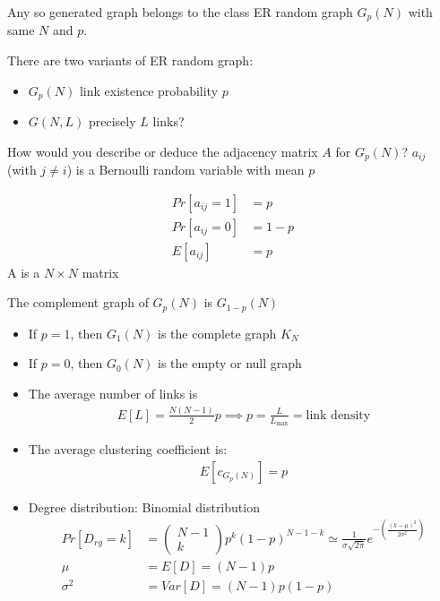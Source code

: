 Any so generated graph belongs to the class ER random graph $G_p(N)$ with same $N$ and $p$.

There are two variants of ER random graph:
\begin{itemize}
  \item $G_p(N)$ link existence probability $p$
  \item $G(N,L)$ precisely $L$ links?
\end{itemize}

How would you describe or deduce the adjacency matrix $A$ for $G_p(N)$?
$a_{ij}$ (with $j \ne i$) is a Bernoulli random variable with mean $p$

\begin{align*}
  Pr[a_{ij} = 1] &= p \\
  Pr[a_{ij} = 0] &= 1 - p \\
  E[a_{ij}] &= p
\end{align*}
A is a $N \times N$ matrix

The complement graph of $G_p(N)$ is $G_{1-p}(N)$

\begin{itemize}
  \item If $p=1$, then $G_1(N)$ is the complete graph $K_N$
  \item If $p=0$, then $G_0(N)$ is the empty or null graph
  \item The average number of links is
  \begin{align*}
    E[L] = \frac{N(N-1)}{2}p \implies p = \frac{L}{L_{\max}} = \text{link density}
  \end{align*}
  \item The average clustering coefficient is:
  \begin{align*}
    E[c_{G_p(N)}] = p
  \end{align*}
  \item Degree distribution: Binomial distribution
  \begin{align*}
    Pr[D_{rg} = k] &= 
    \begin{pmatrix}
      N - 1 \\ k
    \end{pmatrix}
    p^k ( 1- p)^{N-1-k} \simeq 
    \frac{1}{\sigma \sqrt{2\pi}}e^{-\left( \frac{(k-\mu)^2}{2\sigma^2} \right)} \\
    \mu &= E[D] = (N-1)p \\
    \sigma^2 &= Var[D] = (N-1)p(1 - p)
  \end{align*}
\end{itemize}


